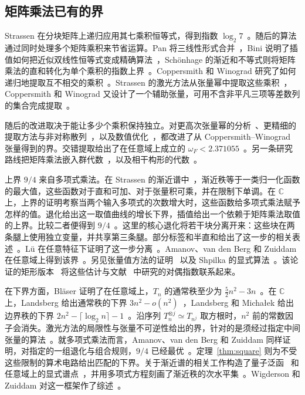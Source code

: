 \subsection{矩阵乘法已有的界}\label{sec:history}

Strassen 在分块矩阵上递归应用其七乘积恒等式，得到指数 $\log_2 7$~\cite{strassen}。随后的算法通过同时处理多个矩阵乘积来节省运算。Pan 将三线性形式合并~\cite{pan}，Bini 说明了插值如何把近似双线性恒等式变成精确算法~\cite{bini}，Sch\"onhage 的渐近和不等式则将矩阵乘法的直和转化为单个乘积的指数上界~\cite{schoenhage}。Coppersmith 和 Winograd 研究了如何递归地提取互不相交的乘积~\cite{cw82}。Strassen 的激光方法从张量幂中提取这些乘积~\cite{Strassen87}，Coppersmith 和 Winograd 又设计了一个辅助张量，可用不含非平凡三项等差数列的集合完成提取~\cite{cw}。

随后的改进取决于能让多少个乘积保持独立。对更高次张量幂的分析~\cite{sto,ds,vw,legall}、更精细的提取方法与非对称散列~\cite{avw,duan,alphaomega,alman}，以及数值优化~\cite{dupont}，都改进了从 Coppersmith--Winograd 张量得到的界。交错提取给出了在任意域上成立的 $\omega_F<2.371055$~\cite{stagger}。另一条研究路线把矩阵乘法嵌入群代数~\cite{cohn2003,cohn2005}，以及相干构形的代数~\cite{CohnUmansSupport}。

上界 $9/4$ 来自多项式乘法。在 Strassen 的渐近谱中~\cite{spectrum}，渐近秩等于一类归一化函数的最大值，这些函数对于直和可加、对于张量积可乘，并在限制下单调。在 $\mathbb C$ 上，上界的证明考察当两个输入多项式的次数增大时，这些函数给多项式乘法赋予怎样的值。退化给出这一取值曲线的增长下界，插值给出一个依赖于矩阵乘法取值的上界。比较二者便得到 $9/4$~\cite[定理~1.1]{nine}。这里的核心退化将若干块分离开来：这些块在两条腿上使用独立变量，并共享第三条腿。部分标签和半直和给出了这一步的相关表述~\cite{two258,li}。L\"u 在任意特征下证明了这一步分离~\cite{lu}。Amanov、van den Berg 和 Zuiddam 在任意域上得到该界~\cite[定理~1.1]{abvz}。另见张量值方法的证明~\cite{tensorvalue} 以及 Shpilka 的显式算法~\cite{shpilka}。该论证的矩形版本~\cite{uznanski,abvz} 将这些估计与文献~\cite{coppersmith,alphaomega} 中研究的对偶指数联系起来。

在下界方面，Bl\"aser 证明了在任意域上，$T_n$ 的通常秩至少为 $\tfrac52 n^2-3n$~\cite{Blaeser}。在 $\mathbb C$ 上，Landsberg 给出通常秩的下界 $3n^2-o(n^2)$~\cite{LandsbergRank}，Landsberg 和 Micha{\l}ek 给出边界秩的下界 $2n^2-\lceil\log_2 n\rceil-1$~\cite{LandsbergMichalek}。沿序列 $T_n^{\otimes j}\simeq T_{n^j}$ 取方根时，$n^2$ 前的常数因子会消失。激光方法的局限性与张量不可逆性给出的界，针对的是须经过指定中间张量的算法~\cite{limits,irreversible}。就多项式乘法而言，Amanov、van den Berg 和 Zuiddam 同样证明，对指定的一组退化与组合规则，$9/4$ 已经最优~\cite[定理~5.4]{abvz}。定理~\ref{thm:square} 则为不受这些限制的算术电路给出匹配的下界。关于渐近谱的相关工作构造了量子泛函~\cite{CVZ} 和任意域上的显式谱点~\cite{almanlipratt}，并用多项式方程刻画了渐近秩的次水平集~\cite{SpectralSublevels}。Wigderson 和 Zuiddam 对这一框架作了综述~\cite{WZ}。
